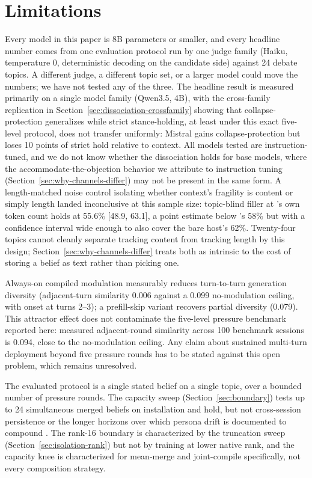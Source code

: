 \section{Limitations}
\label{sec:limitations}

Every model in this paper is 8B parameters or smaller, and every headline number comes
from one evaluation protocol run by one judge family (Haiku, temperature 0,
deterministic decoding on the candidate side) against 24 debate topics. A different
judge, a different topic set, or a larger model could move the numbers; we have not
tested any of the three. The headline result is measured primarily on a single model
family (Qwen3.5, 4B), with the cross-family replication in
Section~\ref{sec:dissociation-crossfamily} showing that collapse-protection generalizes
while strict stance-holding, at least under this exact five-level protocol, does not
transfer uniformly: Mistral gains collapse-protection but loses 10 points of strict
hold relative to context. All models tested are instruction-tuned, and we do not know
whether the dissociation holds for base models, where the accommodate-the-objection
behavior we attribute to instruction tuning (Section~\ref{sec:why-channels-differ}) may
not be present in the same form. A length-matched noise control isolating whether
context's fragility is content or simply length landed inconclusive at this sample
size: topic-blind filler at \condB{}'s own token count holds at 55.6\% [48.9, 63.1], a
point estimate below \condB{}'s 58\% but with a confidence interval wide enough to also
cover the bare host's 62\%. Twenty-four topics cannot cleanly separate tracking content
from tracking length by this design; Section~\ref{sec:why-channels-differ} treats both
as intrinsic to the cost of storing a belief as text rather than picking one.

Always-on compiled modulation measurably reduces turn-to-turn generation diversity
(adjacent-turn similarity 0.006 against a 0.099 no-modulation ceiling, with onset at
turns 2--3); a prefill-skip variant recovers partial diversity (0.079). This attractor
effect does not contaminate the five-level pressure benchmark reported here: measured
adjacent-round similarity across 100 benchmark sessions is 0.094, close to the
no-modulation ceiling. Any claim about sustained multi-turn deployment beyond five
pressure rounds has to be stated against this open problem, which remains unresolved.

The evaluated protocol is a single stated belief on a single topic, over a bounded
number of pressure rounds. The capacity sweep (Section~\ref{sec:boundary}) tests up to
24 simultaneous merged beliefs on installation and hold, but not cross-session
persistence or the longer horizons over which persona drift is documented to compound
\citep{li2024measuring}. The rank-16 boundary is characterized by the truncation
sweep\iflongversion{} (Section~\ref{sec:isolation-rank})\fi{} but not by training at lower native rank,
and the capacity knee is characterized for mean-merge and joint-compile specifically,
not every composition strategy.

